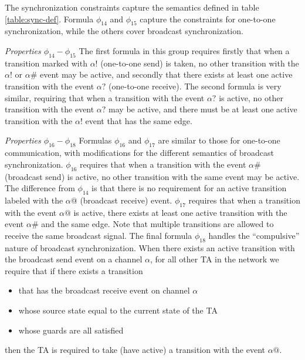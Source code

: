 \documentclass[a4paper,11pt]{report}
\theoremstyle{definition}
\begin{document}
The synchronization constraints capture the semantics defined in table
\ref{table:sync-def}. Formula $\phi_{14}$ and $\phi_{15}$ capture the constraints
for one-to-one synchronization, while the others cover broadcast
synchronization.

\emph{Properties $\phi_{14}-\phi_{15}$} The first formula in this group requires
firstly that when a transition marked with $\alpha{!}$ (one-to-one send) is
taken, no other transition with the $\alpha{!}$ or $\alpha\#$ event may be
active, and secondly that there exists at least one active transition with the
event $\alpha{?}$ (one-to-one receive). The second formula is very similar,
requiring that when a transition with the event $\alpha{?}$ is active, no other
transition with the event $\alpha{?}$ may be active, and there must be at least
one active transition with the $\alpha{!}$ event that has the same edge.

\emph{Properties $\phi_{16}-\phi_{18}$} Formulas $\phi_{16}$ and $\phi_{17}$ are
similar to those for one-to-one communication, with modifications for the
different semantics of broadcast synchronization. $\phi_{16}$ requires that when
a transition with the event $\alpha\#$ (broadcast send) is active, no other
transition with the same event may be active. The difference from $\phi_{14}$ is
that there is no requirement for an active transition labeled with the
$\alpha@$ (broadcast receive) event. $\phi_{17}$ requires that when a transition
with the event $\alpha@$ is active, there exists at least one active transition
with the event $\alpha\#$ and the same edge. Note that multiple transitions are
allowed to receive the same broadcast signal. The final formula $\phi_{18}$
handles the ``compulsive'' nature of broadcast synchronization. When there
exists an active transition with the broadcast send event on a channel $\alpha$,
for all other TA in the network we require that if there exists a transition
\begin{itemize}
  \item that has the broadcast receive event on channel $\alpha$
  \item whose source state equal to the current state of the TA
  \item whose guards are all satisfied
\end{itemize}
then the TA is required to take (have active) a transition with the event
$\alpha@$.

\end{document}
